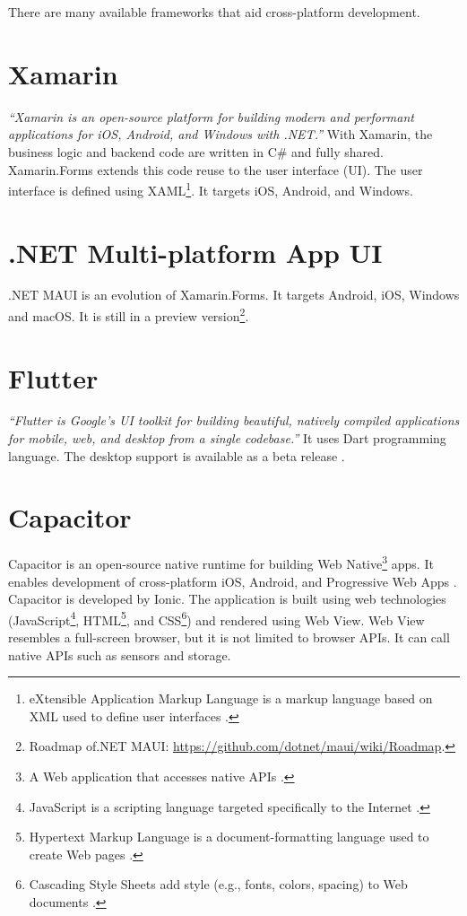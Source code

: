 \documentclass[
  digital, %
  table,   %
  oneside, %
  lof,     %
  lot,     %
]{fithesis3}
\begin{document}
There are many available frameworks that aid cross-platform development.

\section{Xamarin}
\textit{``Xamarin is an open-source platform for building modern and performant applications for iOS, Android, and Windows with .NET.''} \cite{WhatIsXamarin} With Xamarin, the business logic and backend code are written in C\# and fully shared.
Xamarin.Forms extends this code reuse to the user interface (UI). The user interface is defined using XAML\footnote{eXtensible Application Markup Language is a markup language based on XML used to define user interfaces \cite{Hermes2019Building}.}. It targets iOS, Android, and Windows.

\section{.NET Multi-platform App UI}
.NET MAUI is an evolution of Xamarin.Forms. It targets Android, iOS, Windows and macOS. It is still in a preview version\footnote{Roadmap of.NET MAUI: \url{https://github.com/dotnet/maui/wiki/Roadmap}.}.

\section{Flutter}
\textit{``Flutter is Google’s UI toolkit for building beautiful, natively compiled applications for mobile, web, and desktop from a single codebase.''} \cite{FlutterHomepage} It uses Dart programming language. The desktop support is available as a beta release \cite{FlutterDesktopSupport}.

\section{Capacitor}
Capacitor is an open-source native runtime for building Web Native\footnote{A Web application that accesses native APIs \cite{WebNative}.} apps. It enables development of cross-platform iOS, Android, and Progressive Web Apps \cite{CapacitorHomepage}. Capacitor is developed by Ionic. The application is built using web technologies (JavaScript\footnote{JavaScript is a scripting language targeted specifically to the Internet \cite{GartnerJavaScript}.}, HTML\footnote{Hypertext Markup Language is a document-formatting language used to create Web pages \cite{GartnerHTML}.}, and CSS\footnote{Cascading Style Sheets add style (e.g., fonts, colors, spacing) to Web documents \cite{W3CCSS}.}) and rendered using Web View. Web View resembles a full-screen browser, but it is not limited to browser APIs. It can call native APIs such as sensors and storage.
\end{document}
